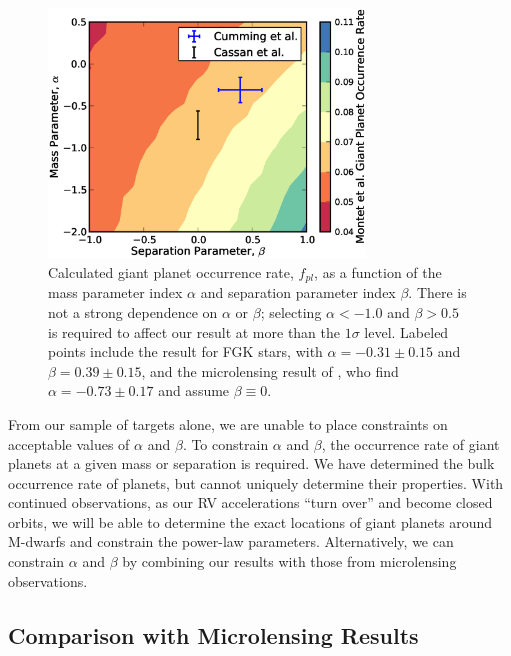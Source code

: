\begin{figure}[htbp]
\centerline{\includegraphics[width=0.75\textwidth]{chapter3/f13.eps}}
\caption[Calculated giant planet occurrence rate, $f_{pl}$, as a function of the mass parameter index $\alpha$ and separation parameter index $\beta$]{Calculated giant planet occurrence rate, $f_{pl}$, as a function of the mass parameter index $\alpha$ and separation parameter index $\beta$. There is not a strong dependence on $\alpha$ or $\beta$; selecting $\alpha < -1.0$ and $\beta > 0.5$ is required to affect our result at more than the $1\sigma$ level. Labeled points include the \citet{Cumming08} result for FGK stars, with $\alpha = -0.31 \pm 0.15$ and $\beta = 0.39 \pm 0.15$, and the microlensing result of \citet{Cassan12}, who find $\alpha = -0.73 \pm 0.17$ and assume $\beta \equiv 0$.
  }
\label{AlpBetOcc}
\end{figure}


From our sample of targets alone, we are unable to place constraints on acceptable values of $\alpha$ and $\beta$. To constrain $\alpha$ and $\beta$, the occurrence rate of giant planets at a given mass or separation is required. We have determined the bulk occurrence rate of planets, but cannot uniquely determine their properties. With continued observations, as our RV accelerations ``turn over'' and become closed orbits, we will be able to determine the exact locations of giant planets around M-dwarfs and constrain the power-law parameters. Alternatively, we can constrain $\alpha$ and $\beta$ by combining our results with those from microlensing observations.


\subsection{Comparison with Microlensing Results}
\label{muL}
 

